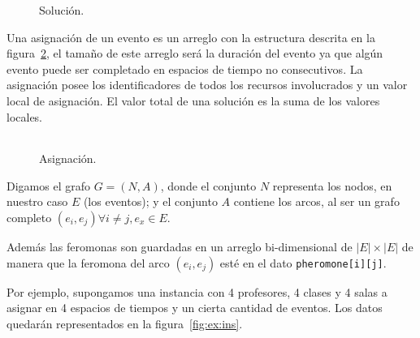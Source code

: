 \documentclass[letter, 10pt]{article}
\renewcommand{\tt}[1]{\texttt{#1}}
\begin{document}
\begin{figure}[htpb]
  \centering
  \begin{tabular}{c}
    
  \end{tabular}
  \caption{Solución.}
  \label{fig:result}
\end{figure}

Una asignación de un evento es un arreglo con la estructura descrita en la
figura~\ref{fig:assign}, el tamaño de este arreglo será la duración del evento
ya que algún evento puede ser completado en espacios de tiempo no consecutivos.
La asignación posee los identificadores de todos los recursos involucrados y un
valor local de asignación. El valor total de una solución es la suma de los
valores locales.

\begin{figure}[htpb]
  \centering
  \begin{tabular}{c}
    
  \end{tabular}
  \caption{Asignación.}
  \label{fig:assign}
\end{figure}

Digamos el grafo $G=(N,A)$, donde el conjunto $N$ representa los nodos, en
nuestro caso $E$ (los eventos); y el conjunto $A$ contiene los arcos, al ser
un grafo completo $(e_i, e_j) \forall i \neq j, e_x \in E$.

Además las feromonas son guardadas en un arreglo bi-dimensional de
$|E|\times|E|$ de manera que la feromona del arco $(e_i, e_j)$ esté en el dato
\tt{pheromone[i][j]}.

Por ejemplo, supongamos una instancia con 4 profesores, 4 clases y 4 salas a
asignar en 4 espacios de tiempos y un cierta cantidad de eventos. Los datos
quedarán representados en la figura~\ref{fig:ex:ins}.
\end{document}
